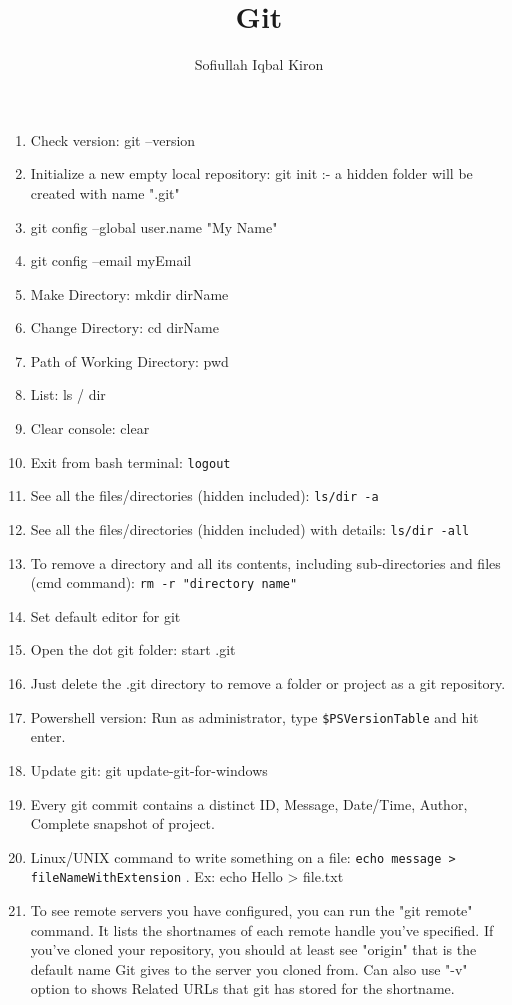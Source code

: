 \documentclass[10 pt]{article}
\title{Git}
\author{Sofiullah Iqbal Kiron}
\begin{document}
\maketitle
\justify

\begin{enumerate}
	\item Check version: git --version
	\item Initialize a new empty local repository: git init :- a hidden folder will be created with name ".git"
	\item git config --global user.name "My Name"
	\item git config --email myEmail
	\item Make Directory: mkdir dirName
	\item Change Directory: cd dirName
	\item Path of Working Directory: pwd
	\item List: ls / dir
	\item Clear console: clear
	\item Exit from bash terminal: \texttt{logout}
	\item See all the files/directories (hidden included): \texttt{ls/dir -a}
	\item See all the files/directories (hidden included) with details: \texttt{ls/dir -all}
	\item To remove a directory and all its contents, including sub-directories and files (cmd command): \texttt{rm -r "directory name"}
	\item Set default editor for git
	\item Open the dot git folder: start .git
	\item Just delete the .git directory to remove a folder or project as a git repository.
	\item Powershell version: Run as administrator, type \texttt{\$PSVersionTable} and hit enter.
	\item Update git: git update-git-for-windows
	\item Every git commit contains a distinct ID, Message, Date/Time, Author, Complete snapshot of project.
	\item Linux/UNIX command to write something on a file: \texttt{echo message > fileNameWithExtension} . Ex: echo Hello > file.txt
	\item To see remote servers you have configured, you can run the "git remote" command. It lists the shortnames of each remote handle you've specified. If you've cloned your repository, you should at least see "origin" that is the default name Git gives to the server you cloned from. Can also use "-v" option to shows Related URLs that git has stored for the shortname.

\end{enumerate}
\end{document}
